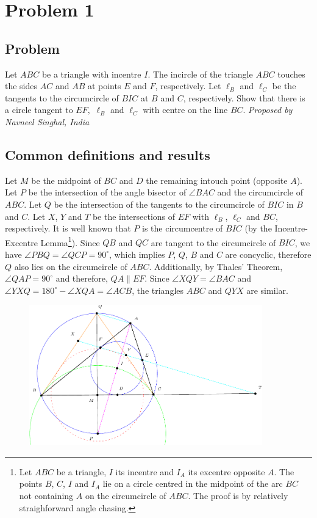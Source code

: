 \section{Problem 1}
\subsection{Problem}
Let $ABC$ be a triangle with incentre $I$. The incircle of the triangle $ABC$ touches the sides $AC$ and $AB$ at points $E$ and $F$, respectively. Let $\ell_B$ and  $\ell_C$ be the tangents to the circumcircle of $BIC$ at $B$ and $C$, respectively. Show that there is a circle tangent to $EF,$ $\ell_B$ and $\ell_C$ with centre on the line $BC$.\nl
\textit{Proposed by Navneel Singhal, India}

\subsection{Common definitions and results}
Let $M$ be the midpoint of $BC$ and $D$ the remaining intouch point (opposite $A$). Let $P$ be the intersection of the angle bisector of $\angle BAC$ and the circumcircle of $ABC$. Let $Q$ be the intersection of the tangents to the circumcircle of $BIC$ in $B$ and $C$. Let $X$, $Y$ and $T$ be the intersections of $EF$ with $\ell_B$, $\ell_C$ and $BC$, respectively.
\nl
It is well known that $P$ is the circumcentre of $BIC$ (by the Incentre-Excentre Lemma\footnote{Let $ABC$ be a triangle, $I$ its incentre and $I_A$ its excentre opposite $A$. The points $B$, $C$, $I$ and $I_A$ lie on a circle centred in the midpoint of the arc $BC$ not containing $A$ on the circumcircle of $ABC$. The proof is by relatively straighforward angle chasing.}). Since $QB$ and $QC$ are tangent to the circumcircle of $BIC$, we have $\angle PBQ=\angle QCP=90^\circ$, which implies $P$, $Q$, $B$ and $C$ are concyclic, therefore $Q$ also lies on the circumcircle of $ABC$. Additionally, by Thales' Theorem, $\angle QAP=90^\circ$ and therefore, $QA\parallel EF$.
\nl
Since $\angle XQY=\angle BAC$ and $\angle YXQ=180^\circ-\angle XQA=\angle ACB$, the triangles $ABC$ and $QYX$ are similar.
\nl
\vfill
\begin{figure}[h]
    \begin{flushright}
        \includegraphics[width=0.9\textwidth]{hard_1_diagram-cropped.pdf}
    \end{flushright}
\end{figure}
\vfill
\newpage
